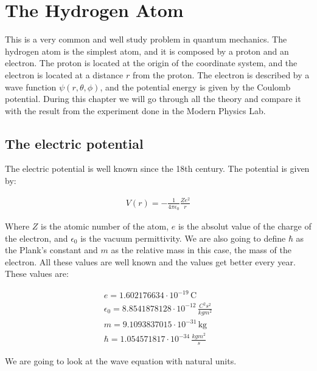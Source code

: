 \setchapterpreamble[u]{\margintoc}
\chapter{The Hydrogen Atom}

This is a very common and well study problem in quantum mechanics. The hydrogen atom is the simplest atom, and it is composed by a proton and an electron. The proton is located at the origin of the coordinate system, and the electron is located at a distance $r$ from the proton. The electron is described by a wave function $\psi(r,\theta,\phi)$, and the potential energy is given by the Coulomb potential. During this chapter we will go through all the theory and compare it with the result from the experiment done in the Modern Physics Lab.


\section{The electric potential}

The electric potential is well known since the 18th century. The potential is given by:

\begin{equation}
  \begin{array}{c}
    V(r) = -\frac{1}{4\pi\epsilon_0}\frac{Ze^2}{r}
  \end{array}
\end{equation}

Where $Z$ is the atomic number of the atom, $e$ is the absolut value of the charge of the electron, and $\epsilon_0$ is the vacuum permittivity. We are also going to define $\hbar$ as the Plank's constant and $m$ as the relative mass in this case, the mass of the electron. All these values are well known and the values get better every year. These values are:

\begin{equation}
  \begin{array}{c}
    e = 1.602176634 \cdot 10^{-19} \, \text{C} \\
    \epsilon_0 = 8.8541878128 \cdot 10^{-12} \, \frac{C^2 s^2}{kg m^2} \\
    m = 9.1093837015 \cdot 10^{-31} \, \text{kg}\\
    \hbar = 1.054571817 \cdot 10^{-34} \, \frac{kg m^2}{s}
  \end{array}
\end{equation}

We are going to look at the wave equation with natural units.

